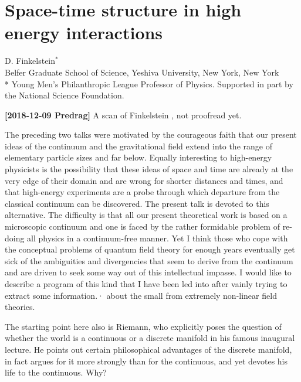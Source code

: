 \newpage
\section{Space-time structure in high energy interactions}
\label{sect:Finkel69a}

\noindent
D. Finkelstein$^*$
\\
Belfer Graduate School
of Science, Yeshiva University, New York, New York
\\{\footnotesize
* Young Men's Philanthropic League Professor of Physics.
  Supported in part by the National Science Foundation.
  }


\medskip

\hfill{\footnotesize
{\bf [2018-12-09 Predrag]} A scan of Finkelstein ,
not proofread yet.
}

\bigskip\bigskip

The preceding two talks were motivated by the courageous faith that our present
ideas of the continuum and the gravitational field extend into the range of
elementary particle sizes and far below. Equally interesting to high-energy
physicists is the possibility that these ideas of space and time are already at
the very edge of their domain and are wrong for shorter distances and times, and
that high-energy experiments are a probe through which departure from the
classical continuum can be discovered. The present talk is devoted to this
alternative. The difficulty is that all our present theoretical work is based on
a microscopic continuum and one is faced by the rather formidable problem of
re-doing all physics in a continuum-free manner. Yet I think those who cope with
the conceptual problems of quantum field theory for enough years eventually get
sick of the ambiguities and divergencies that seem to derive from the continuum
and are driven to seek some way out of this intellectual impasse. I would like to
describe a program of this kind that I have been led into after vainly trying to
extract some information.· about the small from extremely non-linear field
theories.

The starting point here also is Riemann, who explicitly poses the question of
whether the world is a continuous or a discrete manifold in his famous inaugural
lecture. He points out certain philosophical advantages of the discrete manifold,
in fact argues for it more strongly than for the continuous, and yet devotes his
life to the continuous. Why?


